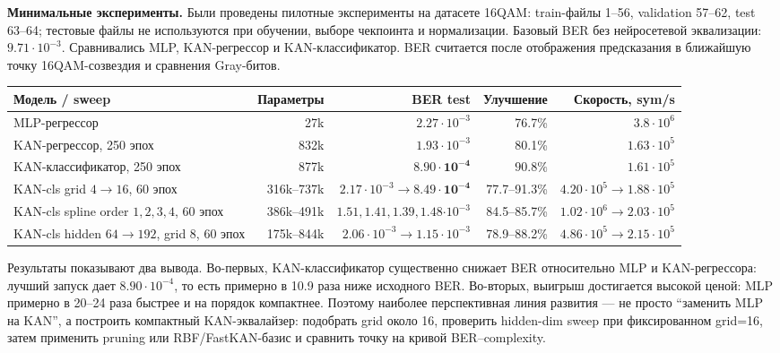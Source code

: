 \documentclass[11pt,a4paper]{article}
\begin{document}
\textbf{Минимальные эксперименты.}
Были проведены пилотные эксперименты на датасете 16QAM: train-файлы 1--56, validation 57--62, test 63--64; тестовые файлы не используются при обучении, выборе чекпоинта и нормализации. Базовый BER без нейросетевой эквализации: \(9.71\cdot 10^{-3}\). Сравнивались MLP, KAN-регрессор и KAN-классификатор. BER считается после отображения предсказания в ближайшую точку 16QAM-созвездия и сравнения Gray-битов.

\begin{center}
\small
\begin{tabular}{|>{\raggedright\arraybackslash}p{38mm}|r|r|r|r|}
\hline
\textbf{Модель / sweep} & \textbf{Параметры} & \textbf{BER test} & \textbf{Улучшение} & \textbf{Скорость, sym/s} \\
\hline
MLP-регрессор & 27k & \(2.27\cdot10^{-3}\) & 76.7\% & \(3.8\cdot10^{6}\) \\
\hline
KAN-регрессор, 250 эпох & 832k & \(1.93\cdot10^{-3}\) & 80.1\% & \(1.63\cdot10^{5}\) \\
\hline
KAN-классификатор, 250 эпох & 877k & \(\mathbf{8.90\cdot10^{-4}}\) & \(\mathbf{90.8\%}\) & \(1.61\cdot10^{5}\) \\
\hline
KAN-cls grid \(4 \to 16\), 60 эпох & 316k--737k & \(2.17\cdot10^{-3}\to\mathbf{8.49\cdot10^{-4}}\) & 77.7--91.3\% & \(4.20\cdot10^{5}\to1.88\cdot10^{5}\) \\
\hline
KAN-cls spline order \(1,2,3,4\), 60 эпох & 386k--491k & \(1.51,1.41,\mathbf{1.39},1.48\)\(\cdot10^{-3}\) & 84.5--85.7\% & \(1.02\cdot10^{6}\to2.03\cdot10^{5}\) \\
\hline
KAN-cls hidden \(64\to192\), grid 8, 60 эпох & 175k--844k & \(2.06\cdot10^{-3}\to1.15\cdot10^{-3}\) & 78.9--88.2\% & \(4.86\cdot10^{5}\to2.15\cdot10^{5}\) \\
\hline
\end{tabular}
\end{center}

Результаты показывают два вывода. Во-первых, KAN-классификатор существенно снижает BER относительно MLP и KAN-регрессора: лучший запуск дает \(8.90\cdot10^{-4}\), то есть примерно в 10.9 раза ниже исходного BER. Во-вторых, выигрыш достигается высокой ценой: MLP примерно в 20--24 раза быстрее и на порядок компактнее. Поэтому наиболее перспективная линия развития --- не просто ``заменить MLP на KAN'', а построить компактный KAN-эквалайзер: подобрать grid около 16, проверить hidden-dim sweep при фиксированном grid=16, затем применить pruning или RBF/FastKAN-базис и сравнить точку на кривой BER--complexity.
\end{document}

